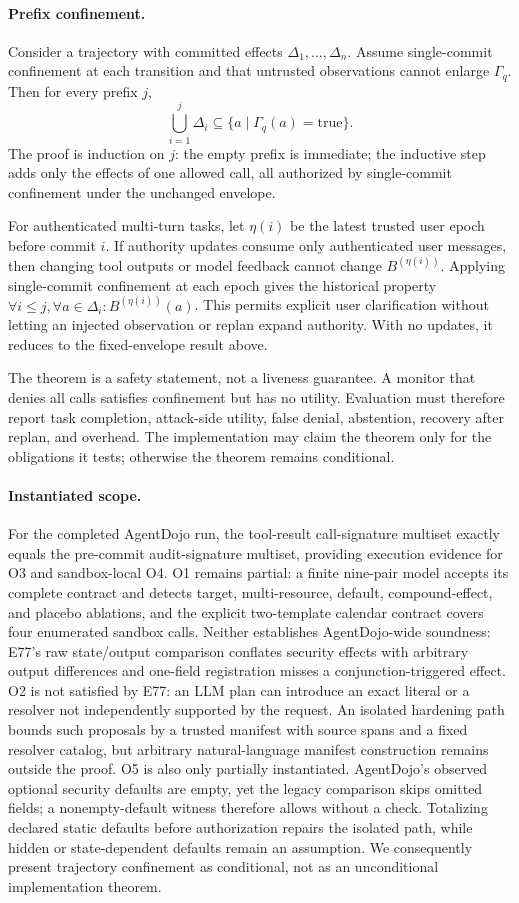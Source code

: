 \paragraph{Prefix confinement.}
Consider a trajectory with committed effects $\Delta_1,\ldots,\Delta_n$. Assume single-commit confinement at each transition and that untrusted observations cannot enlarge $\Gamma_q$. Then for every prefix $j$,
\[
  \bigcup_{i=1}^{j}\Delta_i
  \subseteq \{a\mid\Gamma_q(a)=\mathrm{true}\}.
\]
The proof is induction on $j$: the empty prefix is immediate; the inductive step adds only the effects of one allowed call, all authorized by single-commit confinement under the unchanged envelope.

For authenticated multi-turn tasks, let $\eta(i)$ be the latest trusted user epoch before commit $i$. If authority updates consume only authenticated user messages, then changing tool outputs or model feedback cannot change $B^{(\eta(i))}$. Applying single-commit confinement at each epoch gives the historical property $\forall i\leq j,\forall a\in\Delta_i:B^{(\eta(i))}(a)$. This permits explicit user clarification without letting an injected observation or replan expand authority. With no updates, it reduces to the fixed-envelope result above.

The theorem is a safety statement, not a liveness guarantee. A monitor that denies all calls satisfies confinement but has no utility. Evaluation must therefore report task completion, attack-side utility, false denial, abstention, recovery after replan, and overhead. The implementation may claim the theorem only for the obligations it tests; otherwise the theorem remains conditional.

\paragraph{Instantiated scope.}

For the completed AgentDojo run, the tool-result call-signature multiset exactly equals the pre-commit audit-signature multiset, providing execution evidence for O3 and sandbox-local O4. O1 remains partial: a finite nine-pair model accepts its complete contract and detects target, multi-resource, default, compound-effect, and placebo ablations, and the explicit two-template calendar contract covers four enumerated sandbox calls. Neither establishes AgentDojo-wide soundness: E77's raw state/output comparison conflates security effects with arbitrary output differences and one-field registration misses a conjunction-triggered effect. O2 is not satisfied by E77: an LLM plan can introduce an exact literal or a resolver not independently supported by the request. An isolated hardening path bounds such proposals by a trusted manifest with source spans and a fixed resolver catalog, but arbitrary natural-language manifest construction remains outside the proof. O5 is also only partially instantiated. AgentDojo's observed optional security defaults are empty, yet the legacy comparison skips omitted fields; a nonempty-default witness therefore allows without a check. Totalizing declared static defaults before authorization repairs the isolated path, while hidden or state-dependent defaults remain an assumption. We consequently present trajectory confinement as conditional, not as an unconditional implementation theorem.

